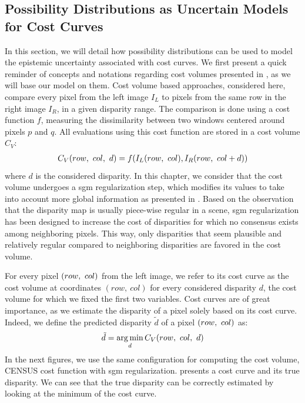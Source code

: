 \subsection{Possibility Distributions as Uncertain Models for Cost Curves}
In this section, we will detail how possibility distributions can be used to model the epistemic uncertainty associated with cost curves. We first present a quick reminder of concepts and notations regarding cost volumes presented in , as we will base our model on them. Cost volume based approaches, considered here, compare every pixel from the left image $I_L$ to pixels from the same row in the right image $I_R$, in a given disparity range. The comparison is done using a cost function $f$, measuring the dissimilarity between two windows centered around pixels $p$ and $q$. All evaluations using this cost function are stored in a cost volume $C_V$:
\begin{align}
	C_V(row, ~col, ~d) = f(I_L(row, ~col), I_R(row, ~col+d))
\end{align}
where $d$ is the considered disparity. In this chapter, we consider that the cost volume undergoes a \acrshort{sgm} regularization step, which modifies its values to take into account more global information as presented in . Based on the observation that the disparity map is usually piece-wise regular in a scene, \acrshort{sgm} regularization has been designed to increase the cost of disparities for which no consensus exists among neighboring pixels. This way, only disparities that seem plausible and relatively regular compared to neighboring disparities are favored in the cost volume.

For every pixel $(row, ~col)$ from the left image, we refer to its cost curve as the cost volume at coordinates $(row,~col)$ for every considered disparity $d$, \ie the cost volume for which we fixed the first two variables. Cost curves are of great importance, as we estimate the disparity of a pixel solely based on its cost curve. Indeed, we define the predicted disparity $\tilde{d}$ of a pixel $(row, ~col)$ as:
\begin{align}
	\tilde{d} = \operatorname*{arg\,min}_d C_V(row, ~col, ~d)
\end{align} 
In the next figures, we use the same configuration for computing the cost volume, \ie CENSUS cost function with \acrshort{sgm} regularization.  presents a cost curve and its true disparity. We can see that the true disparity can be correctly estimated by looking at the minimum of the cost curve.
 
